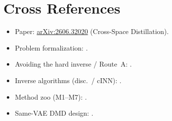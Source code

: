 \documentclass[11pt,a4paper]{article}
\theoremstyle{definition}
\begin{document}
\section*{Cross References}
\begin{itemize}[leftmargin=1.4em,itemsep=1pt]
  \item Paper:
        \href{https://arxiv.org/abs/2606.32020}{arXiv:2606.32020}
        (Cross-Space Distillation).
  \item Problem formalization:
        .
  \item Avoiding the hard inverse / Route~A:
        .
  \item Inverse algorithms (disc.\ / cINN):
        .
  \item Method zoo (M1--M7):
        .
  \item Same-VAE DMD design:
        .
\end{itemize}
\end{document}
